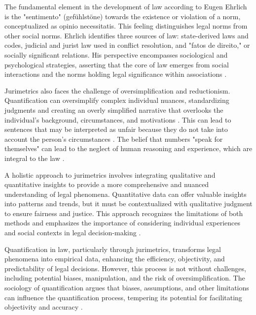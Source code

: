 The fundamental element in the development of law according to Eugen Ehrlich is the "sentimento" (gefühlstöne) towards the existence or violation of a norm, conceptualized as opinio necessitatis. This feeling distinguishes legal norms from other social norms. Ehrlich identifies three sources of law: state-derived laws and codes, judicial and jurist law used in conflict resolution, and "fatos de direito," or socially significant relations. His perspective encompasses sociological and psychological strategies, asserting that the core of law emerges from social interactions and the norms holding legal significance within associations \cite{konzen2024}.

Jurimetrics also faces the challenge of oversimplification and reductionism. Quantification can oversimplify complex individual nuances, standardizing judgments and creating an overly simplified narrative that overlooks the individual's background, circumstances, and motivations \cite{10.1007/s11186-021-09453-1,10.1057/s41599-020-00557-0}. This can lead to sentences that may be interpreted as unfair because they do not take into account the person's circumstances \cite{10.1590/data.2022.65.3.267,10.32586/rcda.v18i1.585}. The belief that numbers "speak for themselves" can lead to the neglect of human reasoning and experience, which are integral to the law \cite{10.1590/data.2022.65.3.267,10.32586/rcda.v18i1.585}.

A holistic approach to jurimetrics involves integrating qualitative and quantitative insights to provide a more comprehensive and nuanced understanding of legal phenomena. Quantitative data can offer valuable insights into patterns and trends, but it must be contextualized with qualitative judgment to ensure fairness and justice. This approach recognizes the limitations of both methods and emphasizes the importance of considering individual experiences and social contexts in legal decision-making \cite{10.1007/s11186-021-09453-1,10.1057/s41599-020-00557-0}.

Quantification in law, particularly through jurimetrics, transforms legal phenomena into empirical data, enhancing the efficiency, objectivity, and predictability of legal decisions. However, this process is not without challenges, including potential biases, manipulation, and the risk of oversimplification. The sociology of quantification argues that biases, assumptions, and other limitations can influence the quantification process, tempering its potential for facilitating objectivity and accuracy \cite{salais2016}.


